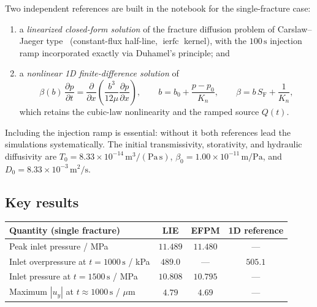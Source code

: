 \documentclass[11pt,a4paper]{tubaf-report}
\begin{document}
Two independent references are built in the notebook for the single-fracture
case:
\begin{enumerate}[nosep]
  \item a \emph{linearized closed-form solution} of the fracture diffusion
        problem of Carslaw--Jaeger type~\cite{carslaw1959}
        (constant-flux half-line, $\operatorname{ierfc}$ kernel), with the
        $100\,\mathrm s$ injection ramp incorporated exactly via Duhamel's
        principle; and
  \item a \emph{nonlinear 1D finite-difference solution} of
        \begin{equation}
          \beta(b)\,\frac{\partial p}{\partial t}
          =\frac{\partial}{\partial x}\!\left(
          \frac{b^3}{12\mu}\frac{\partial p}{\partial x}\right),
          \qquad
          b=b_0+\frac{p-p_0}{K_n},
          \qquad
          \beta=b\,S_{\mathrm F}+\frac{1}{K_n},
          \label{eq:fd-ref}
        \end{equation}
        which retains the cubic-law nonlinearity and the ramped source
        $Q(t)$.
\end{enumerate}
Including the injection ramp is essential: without it both references lead
the simulations systematically. The initial transmissivity, storativity, and
hydraulic diffusivity are
$T_0=8.33\times10^{-14}\,\mathrm{m^3/(Pa\,s)}$,
$\beta_0=1.00\times10^{-11}\,\mathrm{m/Pa}$, and
$D_0=8.33\times10^{-3}\,\mathrm{m^2/s}$.

\subsection{Key results}

\begin{center}
\begin{tabular}{@{}lccc@{}}
\toprule
Quantity (single fracture) & LIE & EFPM & 1D reference \\
\midrule
Peak inlet pressure / MPa & $11.489$ & $11.480$ & --- \\
Inlet overpressure at $t=1000\,\mathrm s$ / kPa & $489.0$ & --- & $505.1$ \\
Inlet pressure at $t=1500\,\mathrm s$ / MPa & $10.808$ & $10.795$ & --- \\
Maximum $|u_y|$ at $t\approx1000\,\mathrm s$ / $\mu$m & $4.79$ & $4.69$ & --- \\
\bottomrule
\end{tabular}
\end{center}
\end{document}
